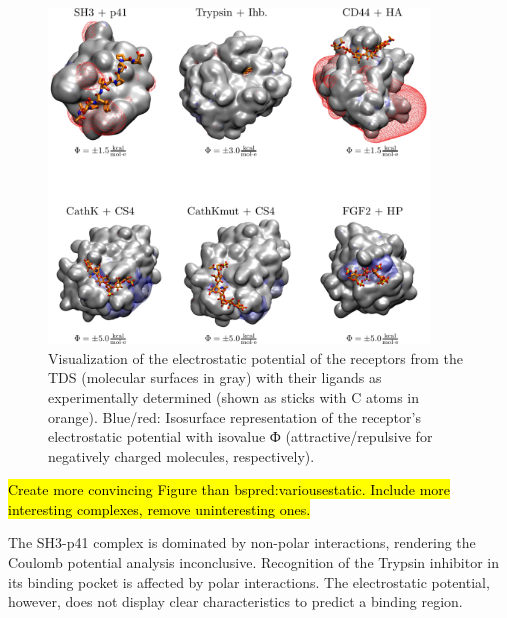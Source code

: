\begin{figure}
\centering
\includegraphics[width=0.9\textwidth]{gfx/bspred/suppl_figure_estatic_distributions_004_1200.png}
\caption[]{
Visualization of the electrostatic potential of the receptors from the TDS
(molecular surfaces in gray) with their ligands as experimentally determined
(shown as sticks with C atoms in orange). Blue/red: Isosurface representation of
the receptor's electrostatic potential with isovalue Ф (attractive/repulsive for
negatively charged molecules, respectively).
}
\label{fig:bspred:various_estatic}
\end{figure}


\hl{Create more convincing Figure than bspred:variousestatic.
Include more interesting complexes, remove uninteresting ones.}

The SH3-p41 complex is dominated by non-polar interactions, rendering the
Coulomb potential analysis inconclusive. Recognition of the Trypsin inhibitor in
its  binding pocket is affected by polar interactions. The electrostatic
potential, however, does not display clear characteristics to predict a binding
region.


